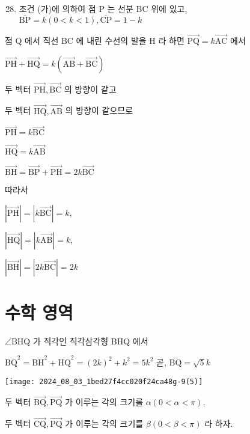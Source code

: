 \documentclass[10pt]{article}
\begin{document}
\begin{enumerate}
  \setcounter{enumi}{27}
  \item 조건 (가)에 의하여 점 P 는 선분 BC 위에 있고, \(\overline{\mathrm{BP}}=k(0<k<1), \overline{\mathrm{CP}}=1-k\)
\end{enumerate}

점 Q 에서 직선 BC 에 내린 수선의 발을 H 라 하면 \(\overrightarrow{\mathrm{PQ}}=k \overrightarrow{\mathrm{AC}}\) 에서

\(\overrightarrow{\mathrm{PH}}+\overrightarrow{\mathrm{HQ}}=k(\overrightarrow{\mathrm{AB}}+\overrightarrow{\mathrm{BC}})\)

두 벡터 \(\overrightarrow{\mathrm{PH}}, \overrightarrow{\mathrm{BC}}\) 의 방향이 같고

두 벡터 \(\overrightarrow{\mathrm{HQ}}, \overrightarrow{\mathrm{AB}}\) 의 방향이 같으므로

\(\overrightarrow{\mathrm{PH}}=k \overrightarrow{\mathrm{BC}}\)

\(\overrightarrow{\mathrm{HQ}}=k \overrightarrow{\mathrm{AB}}\)

\(\overrightarrow{\mathrm{BH}}=\overrightarrow{\mathrm{BP}}+\overrightarrow{\mathrm{PH}}=2 k \overrightarrow{\mathrm{BC}}\)

따라서

\(|\overrightarrow{\mathrm{PH}}|=|k \overrightarrow{\mathrm{BC}}|=k\),

\(|\overrightarrow{\mathrm{HQ}}|=|k \overrightarrow{\mathrm{AB}}|=k\),

\(|\overrightarrow{\mathrm{BH}}|=|2 k \overrightarrow{\mathrm{BC}}|=2 k\)

\section*{수학 영역}
\(\angle \mathrm{BHQ}\) 가 직각인 직각삼각형 BHQ 에서

\(\overline{\mathrm{BQ}}^{2}=\overline{\mathrm{BH}}^{2}+\overline{\mathrm{HQ}}^{2}=(2 k)^{2}+k^{2}=5 k^{2}\) 곧, \(\overline{\mathrm{BQ}}=\sqrt{5} k\)

\begin{center}
\texttt{[image: 2024\_08\_03\_1bed27f4cc020f24ca48g-9(5)]}
\end{center}

두 벡터 \(\overrightarrow{\mathrm{BQ}}, \overrightarrow{\mathrm{PQ}}\) 가 이루는 각의 크기를 \(\alpha(0<\alpha<\pi)\),

두 벡터 \(\overrightarrow{\mathrm{CQ}}, \overrightarrow{\mathrm{PQ}}\) 가 이루는 각의 크기를 \(\beta(0<\beta<\pi)\) 라 하자.
\end{document}
